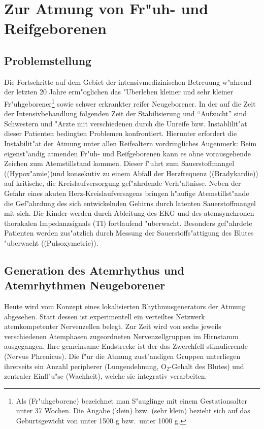 \section{Zur Atmung von Fr"uh- und Reifgeborenen}


\subsection{Problemstellung}

Die Fortschritte auf dem Gebiet der intensivmedizinischen Betreuung w"ahrend der letzten
20 Jahre erm"oglichen das "Uberleben kleiner und sehr kleiner Fr"uhgeborener\footnote{Als
  \begriff(Fr"uhgeborene) bezeichnet man S"auglinge mit einem Gestationsalter unter 37
  Wochen. Die Angabe \naja(klein) bzw.  \naja(sehr klein) bezieht sich auf das
  Geburtsgewicht von unter 1500 g bzw.\ unter 1000 g.}  sowie schwer erkrankter reifer
Neugeborener.  In der auf die Zeit der Intensivbehandlung folgenden Zeit der
Stabilisierung und ``Aufzucht'' sind Schwestern und "Arzte mit verschiedenen durch die
Unreife bzw.  Instablilit"at dieser Patienten bedingten Problemen konfrontiert. Hierunter
erfordert die Instabilit"at der Atmung unter allen Reifealtern vordringliches Augenmerk:
Beim eigenst"andig atmenden Fr"uh- und Reifgeborenen kann es ohne vorausgehende Zeichen
zum Atemstillstand kommen.  Dieser f"uhrt zum Sauerstoffmangel (\begriff(Hypox"amie))und
konsekutiv zu einem Abfall der Herzfrequenz (\begriff(Bradykardie)) auf kritische, die
Kreislaufversorgung gef"ahrdende Verh"altnisse.  Neben der Gefahr eines akuten
Herz-Kreislaufversagens bringen h"aufige Atemstillst"ande die Gef"ahrdung des sich
entwickelnden Gehirns durch latenten Sauerstoffmangel mit sich.  Die Kinder werden durch
Ableitung des EKG und des atemsynchronen thorakalen Impedanzsignals (TI) fortlaufend
"uberwacht. Besonders gef"ahrdete Patienten werden zus"atzlich durch Messung der
Sauerstoffs"attigung des Blutes "uberwacht (\begriff(Pulsoxymetrie)).

\subsection{Generation des Atemrhythus und Atemrhythmen Neugeborener}

Heute wird vom Konzept eines lokalisierten Rhythmusgenerators der Atmung abgesehen. Statt
dessen ist experimentell ein verteiltes Netzwerk atemkompetenter Nervenzellen belegt. Zur
Zeit wird von sechs jeweils verschiedenen Atemphasen zugeordneten Nervenzellgruppen im
Hirnstamm ausgegangen. Ihre gemeinsame Endstrecke ist der das Zwerchfell stimulierende
\begriff(Nervus Phrenicus). Die f"ur die Atmung zust"andigen  Gruppen unterliegen ihrerseits ein Anzahl peripherer (Lungendehnung,
$\mathrm{O}_2$-Gehalt des Blutes) und zentraler Einfl"u"se (Wachheit), welche sie
integrativ verarbeiten. 


